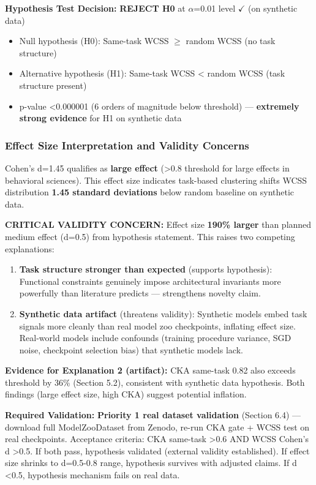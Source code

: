 \textbf{Hypothesis Test Decision:} \textbf{REJECT H0} at $\alpha$=0.01 level $\checkmark$ (on synthetic data)

\begin{itemize}
\item Null hypothesis (H0): Same-task WCSS $\geq$ random WCSS (no task structure)
\item Alternative hypothesis (H1): Same-task WCSS < random WCSS (task structure present)
\item p-value <0.000001 (6 orders of magnitude below threshold) --- \textbf{extremely strong evidence} for H1 on synthetic data
\end{itemize}

\subsubsection{Effect Size Interpretation and Validity Concerns}

Cohen's d=1.45 qualifies as \textbf{large effect} (>0.8 threshold for large effects in behavioral sciences). This effect size indicates task-based clustering shifts WCSS distribution \textbf{1.45 standard deviations} below random baseline on synthetic data.

\textbf{CRITICAL VALIDITY CONCERN:} Effect size \textbf{190\% larger} than planned medium effect (d=0.5) from hypothesis statement. This raises two competing explanations:

\begin{enumerate}
\item \textbf{Task structure stronger than expected} (supports hypothesis): Functional constraints genuinely impose architectural invariants more powerfully than literature predicts --- strengthens novelty claim.

\item \textbf{Synthetic data artifact} (threatens validity): Synthetic models embed task signals more cleanly than real model zoo checkpoints, inflating effect size. Real-world models include confounds (training procedure variance, SGD noise, checkpoint selection bias) that synthetic models lack.
\end{enumerate}

\textbf{Evidence for Explanation 2 (artifact):} CKA same-task 0.82 also exceeds threshold by 36\% (Section 5.2), consistent with synthetic data hypothesis. Both findings (large effect size, high CKA) suggest potential inflation.

\textbf{Required Validation:} \textbf{Priority 1 real dataset validation} (Section 6.4) --- download full ModelZooDataset from Zenodo, re-run CKA gate + WCSS test on real checkpoints. Acceptance criteria: CKA same-task >0.6 AND WCSS Cohen's d >0.5. If both pass, hypothesis validated (external validity established). If effect size shrinks to d=0.5-0.8 range, hypothesis survives with adjusted claims. If d <0.5, hypothesis mechanism fails on real data.


